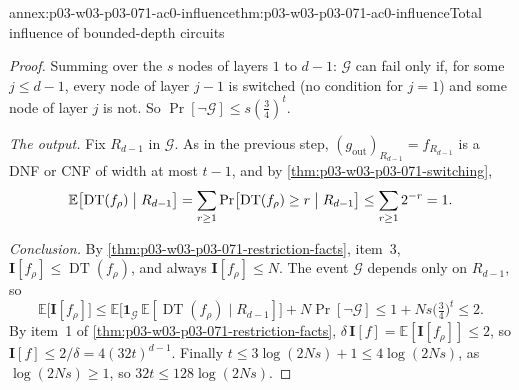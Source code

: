 \begin{annexitem}{annex:p03-w03-p03-071-ac0-influence}{thm:p03-w03-p03-071-ac0-influence}{Total influence of bounded-depth circuits}
\begin{proof}
Summing over the \(s\) nodes of layers \(1\) to \(d-1\): \(\mathcal G\) can
fail only if, for some \(j\leq d-1\), every node of layer \(j-1\) is switched
(no condition for \(j=1\)) and some node of layer \(j\) is not.  So
\(\Pr[\neg\mathcal G]\leq s(\frac34)^t\).

\emph{The output.}  Fix \(R_{d-1}\) in \(\mathcal G\).  As in the previous
step, \((g_{\mathrm{out}})_{R_{d-1}}=f_{R_{d-1}}\) is a DNF or CNF of width at
most \(t-1\), and by \cref{thm:p03-w03-p03-071-switching},
\[
  \mathbb E\bigl[\operatorname{DT}(f_\rho)\bigm|R_{d-1}\bigr]
  =\sum_{r\geq1}\Pr\bigl[\operatorname{DT}(f_\rho)\geq r\bigm|R_{d-1}\bigr]
  \leq\sum_{r\geq1}2^{-r}=1 .
\]

\emph{Conclusion.}  By \cref{thm:p03-w03-p03-071-restriction-facts},
item~3, \(\mathbf I[f_\rho]\leq\operatorname{DT}(f_\rho)\), and always
\(\mathbf I[f_\rho]\leq N\).  The event \(\mathcal G\) depends only on
\(R_{d-1}\), so
\[
  \mathbb E\bigl[\mathbf I[f_\rho]\bigr]\leq
  \mathbb E\bigl[\mathbf 1_{\mathcal G}\,\mathbb E[\operatorname{DT}(f_\rho)
  \mid R_{d-1}]\bigr]+N\Pr[\neg\mathcal G]\leq1+Ns\bigl(\tfrac34\bigr)^t
  \leq2 .
\]
By item~1 of \cref{thm:p03-w03-p03-071-restriction-facts},
\(\delta\,\mathbf I[f]=\mathbb E[\mathbf I[f_\rho]]\leq2\), so
\(\mathbf I[f]\leq2/\delta=4(32t)^{d-1}\).  Finally
\(t\leq3\log(2Ns)+1\leq4\log(2Ns)\), as \(\log(2Ns)\geq1\), so
\(32t\leq128\log(2Ns)\).
\end{proof}
\end{annexitem}

